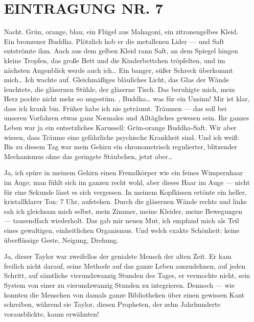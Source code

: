 \section{EINTRAGUNG NR. 7}

Nacht. Grün, orange, blau, ein Flügel aus Mahagoni, ein
zitronengelbes Kleid. Ein bronzener Buddha. Plötzlich hob er die
metallenen Lider — und Saft entströmte ihm. Auch aus dem gelben
Kleid rann Saft, an dem Spiegel hingen kleine Tropfen, das große
Bett und die Kinderbettchen tröpfelten, und im nächsten Augenblick
werde auch ich\ldots{} Ein banger, süßer Schreck überkommt mich\ldots{} Ich
wachte auf. Gleichmäßiges bläuliches Licht, das Glas der Wände
leuchtete, die gläsernen Stühle, der gläserne Tisch.
Das beruhigte mich, mein Herz pochte nicht mehr so ungestüm.
, Buddha\ldots{} was für ein Unsinn! Mir ist klar, dass ich krank
bin. Früher habe ich nie geträumt. Träumen — das soll bei unseren
Vorfahren etwas ganz Normales und Alltägliches gewesen sein. Ihr
ganzes Leben war ja ein entsetzliches Karussell: Grün-orange
Buddha-Saft. Wir aber wissen, dass Träume eine gefährliche
psychische Krankheit sind. Und ich weiß: Bis zu diesem Tag war mein
Gehirn ein chronometrisch regulierter, blitzender Mechanismus ohne
das geringste Stäubchen, jetzt aber\ldots{}

Ja, ich spüre in meinem Gehirn einen Fremdkörper wie ein feines
Wimpernhaar im Auge; man fühlt sich im ganzen recht wohl, aber
dieses Haar im Auge — nicht für eine Sekunde lässt es sich
vergessen. In meinem Kopfkissen ertönte ein heller, kristallklarer
Ton: 7 Uhr, aufstehen. Durch die gläsernen Wände rechts und links
sah ich gleichsam mich selbst, mein Zimmer, meine Kleider, meine
Bewegungen — tausendfach wiederholt. Das gab mir neuen Mut, ich
empfand mich als Teil eines gewaltigen, einheitlichen Organismus.
Und welch exakte Schönheit: keine überflüssige Geste, Neigung,
Drehung.

Ja, dieser Taylor war zweifellos der genialste Mensch der
alten Zeit. Er kam freilich nicht darauf, seine Methode auf das
ganze Leben auszudehnen, auf jeden Schritt, auf sämtliche
vierundzwanzig Stunden des Tages, er vermochte nicht, sein System
von einer zu vierundzwanzig Stunden zu integrieren. Dennoch — wie
konnten die Menschen von damals ganze Bibliotheken über einen
gewissen Kant schreiben, während sie Taylor, diesen Propheten, der
zehn Jahrhunderte vorausblickte, kaum erwähnten!

